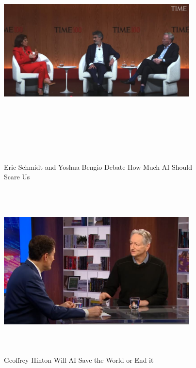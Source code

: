 \documentclass[a4paper,12pt]{article}
\begin{document}
\newpage
\vspace*{1cm} %
\begin{figure}[h]
	\centering
	\vspace{-10pt} %
	\includegraphics[width=0.9\textwidth, height=12cm, keepaspectratio]{../Talks Blogs/Eric Schmidt and Yoshua Bengio Debate How Much AI Should Scare Us}
	\vspace{-5pt} %
	\caption{Eric Schmidt and Yoshua Bengio Debate How Much AI Should Scare Us}
	\vspace{-10pt}
\end{figure}


\vspace{50pt} %
\begin{figure}[h]
	\centering
	\vspace{-10pt} %
	\includegraphics[width=0.9\textwidth, height=9cm, keepaspectratio]{../Talks Blogs/Geoffrey Hinton Will AI Save the World or End it}
	\vspace{-5pt} %
	\caption{Geoffrey Hinton Will AI Save the World or End it}
	\vspace{-10pt}
\end{figure}
\end{document}
